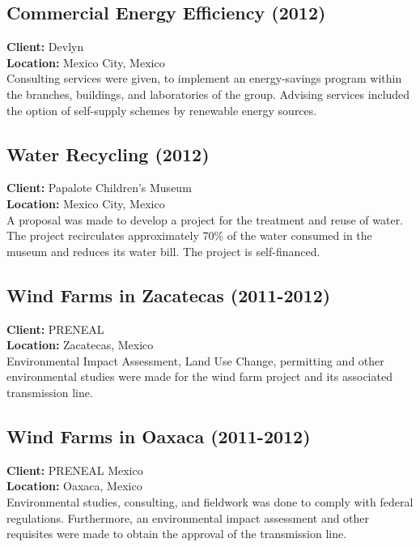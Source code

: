 \documentclass[
	a4paper,
	12pt,
	unnumberedsections,
]{CSSullivanBusinessReport}
\begin{document}
\subsection{Commercial Energy Efficiency (2012)}
\textbf{Client:}  Devlyn \\
\textbf{Location:}  Mexico City, Mexico \\[0.5em]
 Consulting services were given, to implement an energy-savings program within the branches, buildings, and laboratories of the group. Advising services included the option of self-supply schemes by renewable energy sources.

\subsection{Water Recycling (2012)}
\textbf{Client:}  Papalote Children’s Museum \\
\textbf{Location:}  Mexico City, Mexico \\[0.5em]
 A proposal was made to develop a project for the treatment and reuse of water. The project recirculates approximately 70\% of the water consumed in the museum and reduces its water bill. The project is self-financed.

\subsection{Wind Farms in Zacatecas (2011-2012)}
\textbf{Client:}  PRENEAL \\
\textbf{Location:}  Zacatecas, Mexico \\[0.5em]
 Environmental Impact Assessment, Land Use Change, permitting and other environmental studies were made for the wind farm project and its associated transmission line.

\subsection{Wind Farms in Oaxaca (2011-2012)}
\textbf{Client:}  PRENEAL Mexico \\
\textbf{Location:}  Oaxaca, Mexico \\[0.5em]
 Environmental studies, consulting, and fieldwork was done to comply with federal regulations. Furthermore, an environmental impact assessment and other requisites were made to obtain the approval of the transmission line.
\end{document}
